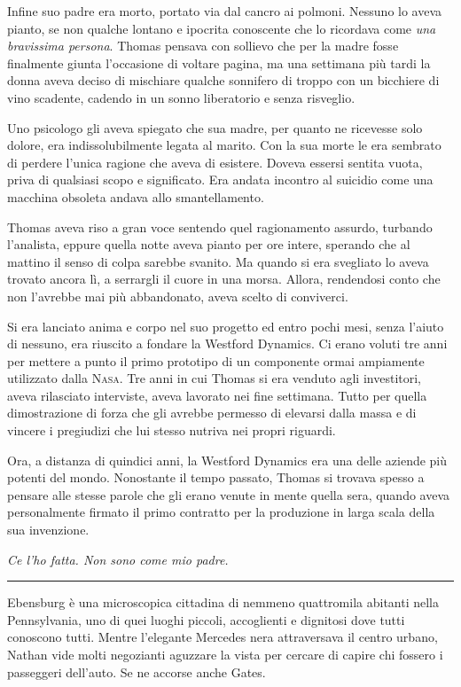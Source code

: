 \documentclass[a4paper,oneside,9pt]{memoir}
\begin{document}
Infine suo padre era morto, portato via dal cancro ai polmoni. Nessuno lo aveva pianto, se non qualche lontano e
ipocrita conoscente che lo ricordava come \emph{una bravissima persona}. Thomas pensava con sollievo che per la madre
fosse finalmente giunta l'occasione di voltare pagina, ma una settimana più tardi la donna aveva deciso di mischiare
qualche sonnifero di troppo con un bicchiere di vino scadente, cadendo in un sonno liberatorio e senza risveglio.

Uno psicologo gli aveva spiegato che sua madre, per quanto ne ricevesse solo dolore, era indissolubilmente legata al
marito. Con la sua morte le era sembrato di perdere l'unica ragione che aveva di esistere. Doveva essersi sentita vuota,
priva di qualsiasi scopo e significato. Era andata incontro al suicidio come una macchina obsoleta andava allo
smantellamento.

Thomas aveva riso a gran voce sentendo quel ragionamento assurdo, turbando l'analista, eppure quella notte aveva pianto
per ore intere, sperando che al mattino il senso di colpa sarebbe svanito. Ma quando si era svegliato lo aveva trovato
ancora lì, a serrargli il cuore in una morsa. Allora, rendendosi conto che non l'avrebbe mai più abbandonato, aveva
scelto di conviverci.

Si era lanciato anima e corpo nel suo progetto ed entro pochi mesi, senza l'aiuto di nessuno, era riuscito a fondare la
Westford Dynamics. Ci erano voluti tre anni per mettere a punto il primo prototipo di un componente ormai ampiamente
utilizzato dalla {\scshape Nasa}. Tre anni in cui Thomas si era venduto agli investitori, aveva rilasciato interviste,
aveva lavorato nei fine settimana. Tutto per quella dimostrazione di forza che gli avrebbe permesso di elevarsi dalla
massa e di vincere i pregiudizi che lui stesso nutriva nei propri riguardi.

Ora, a distanza di quindici anni, la Westford Dynamics era una delle aziende più potenti del mondo. Nonostante il tempo
passato, Thomas si trovava spesso a pensare alle stesse parole che gli erano venute in mente quella sera, quando aveva
personalmente firmato il primo contratto per la produzione in larga scala della sua invenzione.

\emph{Ce l'ho fatta. Non sono come mio padre.}

\plainbreak{1}

Ebensburg è una microscopica cittadina di nemmeno quattromila abitanti nella Pennsylvania, uno di quei luoghi piccoli,
accoglienti e dignitosi dove tutti conoscono tutti. Mentre l'elegante Mercedes nera attraversava il centro urbano,
Nathan vide molti negozianti aguzzare la vista per cercare di capire chi fossero i passeggeri dell'auto. Se ne accorse
anche Gates.
\end{document}
